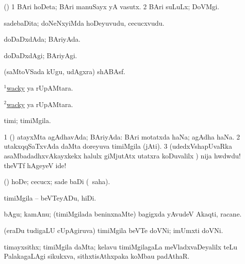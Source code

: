 \bentry
{} 
\gl{\nA}
\expl{}
\bmng
(\ashi) 
\bnum
\num{1} BAri hoDeta; BAri manuSayx yA vasutx. 
\num{2} BAri suLuLx; DoVMgi. 
\enum
\emng
\eentry

\bentry
{} 
\gl{\nA}
\expl{}
\bmng
sadebaDita; doNeNxyiMda hoDeyuvudu, cecucxvudu. 
\emng
\eentry

\bentry
{} 
\gl{\gu}
\expl{}
\bmng
doDaDxdAda; BAriyAda. 
\emng
\eentry

\bentry
{} 
\gl{\kirxvi}
\expl{}
\bmng
doDaDxdAgi; BAriyAgi. 
\emng
\eentry

\bentry
{} 
\gl{\BAavayx}
\expl{}
\bmng
(saMtoVSada kUgu, udAgxra) shABAsf. 
\emng
\eentry

\bentry
{} 
\gl{\gu}
\expl{}
\bmng
\hyperlink{wacky(1)}{$^1$wacky} ya rUpAMtara. 
\emng
\eentry

\bentry
{} 
\gl{\nA}
\expl{}
\bmng
\hyperlink{wacky(2)}{$^2$wacky} ya rUpAMtara. 
\emng
\eentry

\bentry
{} 
\gl{\nA}
\bmng
timi; timiMgila. 
\emng

\noindent 
\gl{\pagu}
\expl{}
\bmng
\bnum
\num{1}  (\AmA) atayxMta agAdhavAda; BAriyAda:  BAri motatxda haNa; agAdha haNa. 
\num{2}  utakxqqSaTxvAda daMta doreyuva timiMgila (jAti). 
\num{3}  (udedxVshapUvaRka asaMbadadhxvAkayxkekx halulx giMjutAtx utatxra koDuvalilx \parx) nija hwdwdu! theVTf hAgeyeV ide! 
\enum
\emng
\eentry

\bentry
{} 
\gl{\sakirx}
\expl{}
\bmng
(\AmA) hoDe; cecucx; sade baDi (\akirx\ saha). 
\emng

\noindent 
\gl{\akirx}
\expl{}
\bmng
timiMgila -- beVTeyADu, hiDi. 
\emng
\eentry

\bentry
{} 
\gl{\nA}
\expl{}
\bmng
bAgu; kamAnu; (timiMgilada beninxnaMte) bagigxda yAvudeV Akaqti, racane. 
\emng
\eentry

\bentry
{} 
\gl{\nA}
\expl{}
\bmng
(eraDu tudigaLU cUpAgiruva) timiMgila beVTe doVNi; imUmxti doVNi. 
\emng
\eentry

\bentry
{} 
\gl{\nA}
\expl{}
\bmng
timayxsithx; timiMgila daMta; kelavu timiMgilagaLa meVladxvaDeyalilx teLu PalakagaLAgi sikukxva, sithxtisAthxpaka koMbau padAthaR. 
\emng
\eentry

